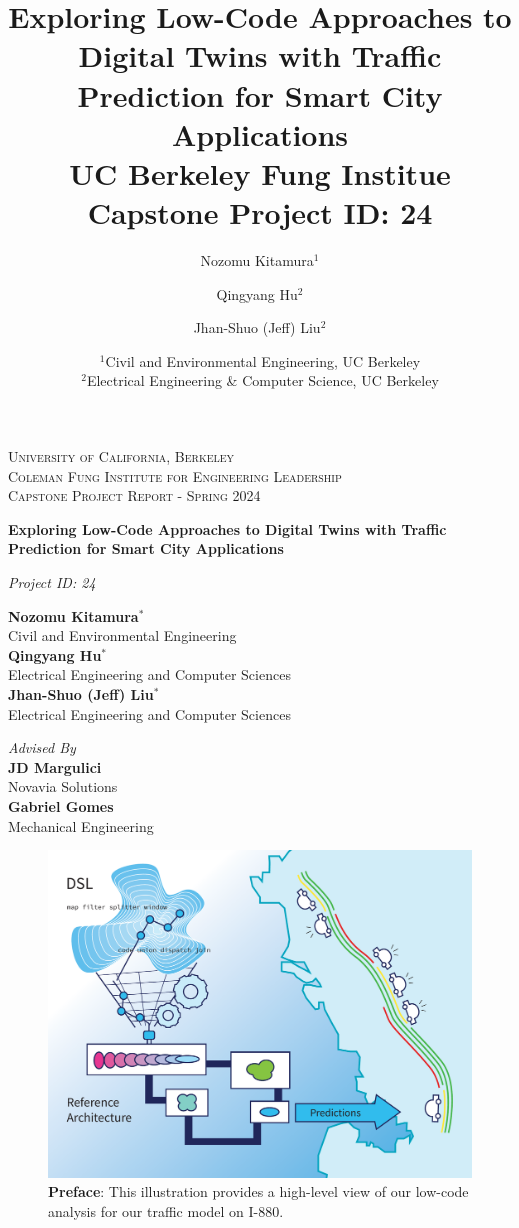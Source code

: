 \documentclass[twocolumn]{report}
\title{{\bf Exploring Low-Code Approaches to Digital Twins with Traffic Prediction for Smart City Applications} \\ \medskip \Large UC Berkeley Fung Institue Capstone Project ID: 24}
\author{Nozomu Kitamura$^1$ \and Qingyang Hu$^2$ \and Jhan-Shuo (Jeff) Liu$^2$}
\date{%
    $^1$Civil and Environmental Engineering, UC Berkeley\\%
    $^2$Electrical Engineering \& Computer Science, UC Berkeley\\[1ex]%
}
\begin{document}
\begin{titlepage}
	\centering
    {\scshape\Large University of California, Berkeley \\ Coleman Fung Institute for Engineering Leadership \\ Capstone Project Report - Spring 2024\par}
    \vfill
    
	{\huge\bf Exploring Low-Code Approaches to Digital Twins with Traffic Prediction for Smart City Applications\par}
    \vspace{0.5cm}
    
    {\large {\it Project ID: 24}}
	\vfill
	
	{\Large 
    {\bf Nozomu Kitamura$^*$} \\ Civil and Environmental Engineering \\ \medskip 
    {\bf Qingyang Hu$^*$}  \\ Electrical Engineering and Computer Sciences \\ 
    \medskip 
    {\bf Jhan-Shuo (Jeff) Liu$^*$} \\ Electrical Engineering and Computer Sciences\\}\par

	\vfill
	{\it Advised By} \\ \medskip
	{\bf JD Margulici} \\ Novavia Solutions \\ \medskip
    {\bf Gabriel Gomes} \\ Mechanical Engineering
    


	\vfill
\def\thefootnote{*}\def\thefootnote{\arabic{footnote}}
\end{titlepage}
\newpage

\begin{figure}
    \centering
    \includegraphics[width=\linewidth]{img/illustration.pdf}
    \caption*{{\bf Preface}: This illustration provides a high-level view of our low-code analysis for our traffic model on I-880.}
\end{figure}

\newpage
\tableofcontents


\newpage






\newpage
{}


\end{document}
